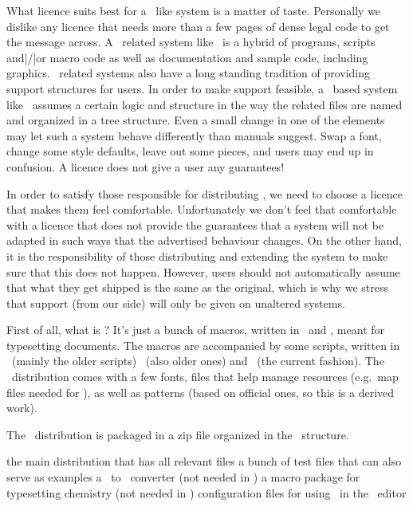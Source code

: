 What licence suits best for a \TEX\ like system is a matter of taste. Personally
we dislike any licence that needs more than a few pages of dense legal code to
get the message across. A \TEX\ related system like \CONTEXT\ is a hybrid of
programs, scripts and|/|or macro code as well as documentation and sample code,
including graphics. \TEX\ related systems also have a long standing tradition of
providing support structures for users. In order to make support feasible, a
\TEX\ based system like \CONTEXT\ assumes a certain logic and structure in the
way the related files are named and organized in a tree structure. Even a small
change in one of the elements may let such a system behave differently than
manuals suggest. Swap a font, change some style defaults, leave out some pieces,
and users may end up in confusion. A licence does not give a user any guarantees!

In order to satisfy those responsible for distributing \CONTEXT, we need to
choose a licence that makes them feel comfortable. Unfortunately we don't feel
that comfortable with a licence that does not provide the guarantees that a
system will not be adapted in such ways that the advertised behaviour changes. On
the other hand, it is the responsibility of those distributing and extending the
system to make sure that this does not happen. However, users should not
automatically assume that what they get shipped is the same as the original,
which is why we stress that support (from our side) will only be given on
unaltered systems.

First of all, what is \CONTEXT ? It's just a bunch of macros, written in \TEX\
and \METAPOST, meant for typesetting documents. The macros are accompanied by
some scripts, written in \PERL\ (mainly the older scripts) \RUBY\ (also older
ones) and \LUA\ (the current fashion). The \CONTEXT\ distribution comes with a
few fonts, files that help manage resources (e.g.\ map files needed for \MKII),
as well as patterns (based on official ones, so this is a derived work).

The \CONTEXT\ distribution is packaged in a zip file organized in the \TDS\
structure.

\starttabulate[|lT|p|]
\NC {} \NC the main distribution that has all relevant files \NC \NR
\NC \type {cont-tst.7z}  \NC a bunch of test files that can also serve as examples \NC \NR
\NC \type {cont-mpd.zip} \NC a \METAPOST\ to \PDF\ converter (not needed in \CONTEXT) \NC \NR
\NC \type {cont-ppc.zip} \NC a macro package for typesetting chemistry (not needed in \CONTEXT) \NC \NR
\NC \type {cont-sci.zip} \NC configuration files for using \CONTEXT\ in the \SCITE\ editor \NC \NR
\stoptabulate

